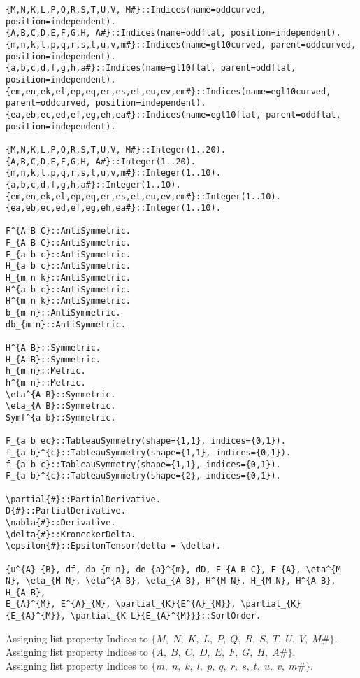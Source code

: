 \documentclass[11pt]{article}
\begin{document}
{\color[named]{Blue}\begin{verbatim}
{M,N,K,L,P,Q,R,S,T,U,V, M#}::Indices(name=oddcurved, position=independent).
{A,B,C,D,E,F,G,H, A#}::Indices(name=oddflat, position=independent).
{m,n,k,l,p,q,r,s,t,u,v,m#}::Indices(name=gl10curved, parent=oddcurved, position=independent).
{a,b,c,d,f,g,h,a#}::Indices(name=gl10flat, parent=oddflat, position=independent).
{em,en,ek,el,ep,eq,er,es,et,eu,ev,em#}::Indices(name=egl10curved, parent=oddcurved, position=independent).
{ea,eb,ec,ed,ef,eg,eh,ea#}::Indices(name=egl10flat, parent=oddflat, position=independent).

{M,N,K,L,P,Q,R,S,T,U,V, M#}::Integer(1..20).
{A,B,C,D,E,F,G,H, A#}::Integer(1..20).
{m,n,k,l,p,q,r,s,t,u,v,m#}::Integer(1..10).
{a,b,c,d,f,g,h,a#}::Integer(1..10).
{em,en,ek,el,ep,eq,er,es,et,eu,ev,em#}::Integer(1..10).
{ea,eb,ec,ed,ef,eg,eh,ea#}::Integer(1..10).

F^{A B C}::AntiSymmetric.
F_{A B C}::AntiSymmetric.
F_{a b c}::AntiSymmetric.
H_{a b c}::AntiSymmetric.
H_{m n k}::AntiSymmetric.
H^{a b c}::AntiSymmetric.
H^{m n k}::AntiSymmetric.
b_{m n}::AntiSymmetric.
db_{m n}::AntiSymmetric.

H^{A B}::Symmetric.
H_{A B}::Symmetric.
h_{m n}::Metric.
h^{m n}::Metric.
\eta^{A B}::Symmetric.
\eta_{A B}::Symmetric.
Symf^{a b}::Symmetric.

F_{a b ec}::TableauSymmetry(shape={1,1}, indices={0,1}).
f_{a b}^{c}::TableauSymmetry(shape={1,1}, indices={0,1}).
f_{a b c}::TableauSymmetry(shape={1,1}, indices={0,1}).
F_{a b}^{c}::TableauSymmetry(shape={2}, indices={0,1}).

\partial{#}::PartialDerivative.
D{#}::PartialDerivative.
\nabla{#}::Derivative.
\delta{#}::KroneckerDelta.
\epsilon{#}::EpsilonTensor(delta = \delta).

{u^{A}_{B}, df, db_{m n}, de_{a}^{m}, dD, F_{A B C}, F_{A}, \eta^{M N}, \eta_{M N}, \eta^{A B}, \eta_{A B}, H^{M N}, H_{M N}, H^{A B}, H_{A B},
E_{A}^{M}, E^{A}_{M}, \partial_{K}{E^{A}_{M}}, \partial_{K}{E_{A}^{M}}, \partial_{K L}{E_{A}^{M}}}::SortOrder.
\end{verbatim}}
Assigning list property Indices to $\{M,\; N,\; K,\; L,\; P,\; Q,\; R,\; S,\; T,\; U,\; V,\; M\#\}$.
\\
Assigning list property Indices to $\{A,\; B,\; C,\; D,\; E,\; F,\; G,\; H,\; A\#\}$.
\\
Assigning list property Indices to $\{m,\; n,\; k,\; l,\; p,\; q,\; r,\; s,\; t,\; u,\; v,\; m\#\}$.
\end{document}

